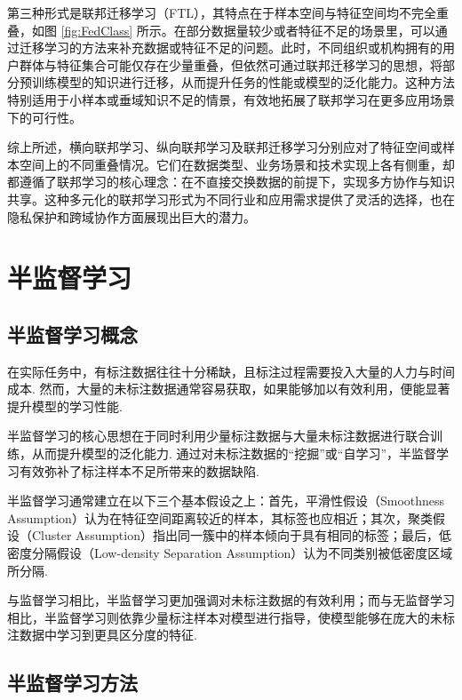 第三种形式是联邦迁移学习（FTL），其特点在于样本空间与特征空间均不完全重叠\citep{yang2019federated,chen2020vafl}，如图 \ref{fig:FedClass} 所示。在部分数据量较少或者特征不足的场景里，可以通过迁移学习的方法来补充数据或特征不足的问题。此时，不同组织或机构拥有的用户群体与特征集合可能仅存在少量重叠，但依然可通过联邦迁移学习的思想，将部分预训练模型的知识进行迁移，从而提升任务的性能或模型的泛化能力。这种方法特别适用于小样本或垂域知识不足的情景，有效地拓展了联邦学习在更多应用场景下的可行性。

综上所述，横向联邦学习、纵向联邦学习及联邦迁移学习分别应对了特征空间或样本空间上的不同重叠情况。它们在数据类型、业务场景和技术实现上各有侧重，却都遵循了联邦学习的核心理念：在不直接交换数据的前提下，实现多方协作与知识共享。这种多元化的联邦学习形式为不同行业和应用需求提供了灵活的选择，也在隐私保护和跨域协作方面展现出巨大的潜力。



\section{半监督学习}
\subsection{半监督学习概念}
在实际任务中，有标注数据往往十分稀缺，且标注过程需要投入大量的人力与时间成本\citep{chapelle2009semi}. 然而，大量的未标注数据通常容易获取，如果能够加以有效利用，便能显著提升模型的学习性能\citep{zhu2005semi}.

半监督学习的核心思想在于同时利用少量标注数据与大量未标注数据进行联合训练，从而提升模型的泛化能力\citep{van2020survey}. 通过对未标注数据的“挖掘”或“自学习”，半监督学习有效弥补了标注样本不足所带来的数据缺陷\citep{chapelle2009semi}.

半监督学习通常建立在以下三个基本假设之上：首先，平滑性假设（Smoothness Assumption）认为在特征空间距离较近的样本，其标签也应相近；其次，聚类假设（Cluster Assumption）指出同一簇中的样本倾向于具有相同的标签；最后，低密度分隔假设（Low-density Separation Assumption）认为不同类别被低密度区域所分隔\citep{zhu2005semi}.

与监督学习相比，半监督学习更加强调对未标注数据的有效利用；而与无监督学习相比，半监督学习则依靠少量标注样本对模型进行指导，使模型能够在庞大的未标注数据中学习到更具区分度的特征\citep{van2020survey}.
\subsection{半监督学习方法}

